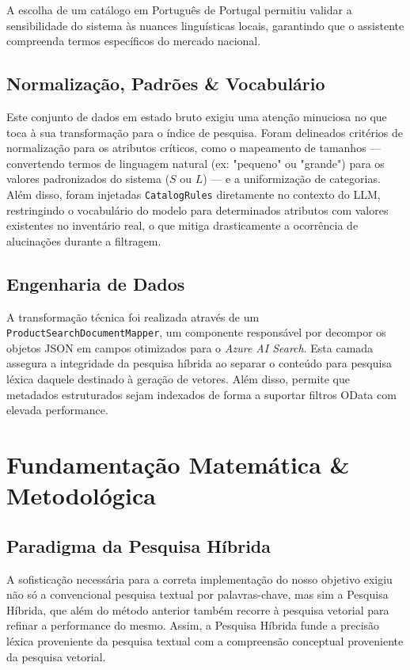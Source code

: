 \documentclass[runningheads]{llncs}
\begin{document}
A escolha de um catálogo em Português de Portugal permitiu validar a sensibilidade do sistema às nuances linguísticas locais, garantindo que o assistente compreenda termos específicos do mercado nacional.

\subsection*{Normalização, Padrões \& Vocabulário}
Este conjunto de dados em estado bruto exigiu uma atenção minuciosa no que toca à sua transformação para o índice de pesquisa. Foram delineados critérios de normalização para os atributos críticos, como o mapeamento de tamanhos — convertendo termos de linguagem natural (ex: "pequeno" ou "grande") para os valores padronizados do sistema ($S$ ou $L$) — e a uniformização de categorias. Além disso, foram injetadas \texttt{CatalogRules} diretamente no contexto do LLM, restringindo o vocabulário do modelo para determinados atributos com valores existentes no inventário real, o que mitiga drasticamente a ocorrência de alucinações durante a filtragem.

\subsection*{Engenharia de Dados}
A transformação técnica foi realizada através de um \texttt{ProductSearchDocumentMapper}, um componente responsável por decompor os objetos JSON em campos otimizados para o \textit{Azure AI Search}. Esta camada assegura a integridade da pesquisa híbrida ao separar o conteúdo para pesquisa léxica daquele destinado à geração de vetores. Além disso, permite que metadados estruturados sejam indexados de forma a suportar filtros OData com elevada performance.

\section*{Fundamentação Matemática \& Metodológica}
\subsection*{Paradigma da Pesquisa Híbrida}
A sofisticação necessária para a correta implementação do nosso objetivo exigiu não só a convencional pesquisa textual por palavras-chave, mas sim a Pesquisa Híbrida, que além do método anterior também recorre à pesquisa vetorial para refinar a performance do mesmo. Assim, a Pesquisa Híbrida funde a precisão léxica proveniente da pesquisa textual com a compreensão conceptual proveniente da pesquisa vetorial.
\end{document}
